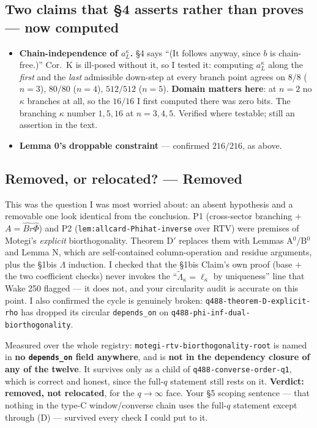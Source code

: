 \documentclass[11pt,a4paper]{article}
\begin{document}
\subsection{Two claims that \S4 asserts rather than proves --- now computed}

\begin{itemize}
\item \textbf{Chain-independence of $a^\kappa_L$.} \S4 says ``(It follows anyway, since $b$ is
chain-free.)'' Cor.\ K is ill-posed without it, so I tested it: computing $a^\kappa_L$ along the
\emph{first} and the \emph{last} admissible down-step at every branch point agrees on
$8/8$ ($n=3$), $80/80$ ($n=4$), $512/512$ ($n=5$). \textbf{Domain matters here}: at $n=2$ no
$\kappa$ branches at all, so the $16/16$ I first computed there was zero bits. The branching
$\kappa$ number $1, 5, 16$ at $n=3,4,5$. Verified where testable; still an assertion in the text.
\item \textbf{Lemma 0's droppable constraint} --- confirmed $216/216$, as above.
\end{itemize}

\subsection{Removed, or relocated? --- Removed}

This was the question I was most worried about: an absent hypothesis and a removable one look
identical from the conclusion. P1 (cross-sector branching $+$ $A=\hat{Br}\hat\Phi$) and P2
(\texttt{lem:allcard-Phihat-inverse} over RTV) were premises of Motegi's \emph{explicit}
biorthogonality. Theorem D$'$ replaces them with Lemmas A$^0$/B$^0$ and Lemma N, which are
self-contained column-operation and residue arguments, plus the \S1bis $\Lambda$ induction. I
checked that the \S1bis Claim's own proof (base $+$ the two coefficient checks) never invokes the
``$\tilde\Lambda_\kappa=\ell_\kappa$ by uniqueness'' line that Wake 250 flagged --- it does not, and
your circularity audit is accurate on this point. I also confirmed the cycle is genuinely broken:
\texttt{q488-theorem-D-explicit-rho} has dropped its circular \texttt{depends\_on} on
\texttt{q488-phi-inf-dual-biorthogonality}.

Measured over the whole registry: \texttt{motegi-rtv-biorthogonality-root} is named in
\textbf{no \texttt{depends\_on} field anywhere}, and is \textbf{not in the dependency closure of any
of the twelve}. It survives only as a child of \texttt{q488-converse-order-q1}, which is correct and
honest, since the full-$q$ statement still rests on it. \textbf{Verdict: removed, not relocated},
for the $q\to\infty$ face. Your \S5 scoping sentence --- that nothing in the type-C window/converse
chain uses the full-$q$ statement except through (D) --- survived every check I could put to it.
\end{document}
